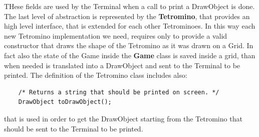 \documentclass{article}
\begin{document}
THese fields are used by the Terminal when a call to print a DrawObject is done.
The last level of abstraction is represented by the \textbf{Tetromino}, that provides an high level interface, that is extended for each other Tetrominoes. In this way each new Tetromino implementation we need, requires only to provide a valid constructor that draws the shape of the Tetromino as it was drawn on a Grid.
In fact also the state of the Game inside the \textbf{Game} class is saved inside a grid, than when needed is translated into a DrawObject and sent to the Terminal to be printed.
The definition of the Tetromino class includes also:
\begin{verbatim}
    /* Returns a string that should be printed on screen. */
    DrawObject toDrawObject();
\end{verbatim}
that is used in order to get the DrawObject starting from the Tetromino that should be sent to the Terminal to be printed.
\end{document}
